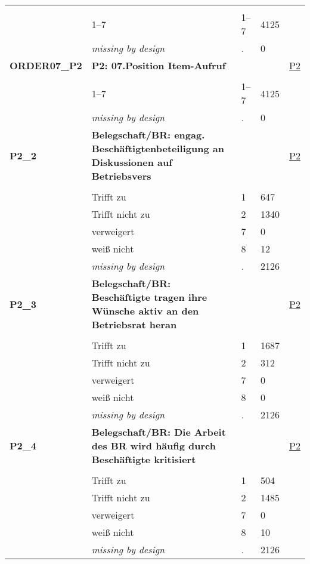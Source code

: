\begin{longtable}{| L{2.65cm} | L{8cm} | C{1.5cm} | R{1.25cm} | C{2.25cm}  |}
   &  &  &  &  \\ 
   & 1--7 & 1--7 & 4125 &  \\ 
   & \textit{missing by design} & \textit{.} & 0 &  \\ 
   \midrule
\textbf{ORDER07\_P2}\label{var:ORDER07:P2} & \textbf{P2: 07.Position Item-Aufruf} &  &  & \hyperref[P2]{P2} \\ 
   &  &  &  &  \\ 
   & 1--7 & 1--7 & 4125 &  \\ 
   & \textit{missing by design} & \textit{.} & 0 &  \\ 
   \midrule
\textbf{P2\_2}\label{var:P2:2} & \textbf{Belegschaft/BR: engag. Beschäftigtenbeteiligung an Diskussionen auf Betriebsvers} &  &  & \hyperref[P2]{P2} \\ 
   &  &  &  &  \\ 
   & Trifft zu & 1 & 647 &  \\ 
   & Trifft nicht zu & 2 & 1340 &  \\ 
   & verweigert & 7 & 0 &  \\ 
   & weiß nicht & 8 & 12 &  \\ 
   & \textit{missing by design} & \textit{.} & 2126 &  \\ 
   \midrule
\textbf{P2\_3}\label{var:P2:3} & \textbf{Belegschaft/BR: Beschäftigte tragen ihre Wünsche aktiv an den Betriebsrat heran} &  &  & \hyperref[P2]{P2} \\ 
   &  &  &  &  \\ 
   & Trifft zu & 1 & 1687 &  \\ 
   & Trifft nicht zu & 2 & 312 &  \\ 
   & verweigert & 7 & 0 &  \\ 
   & weiß nicht & 8 & 0 &  \\ 
   & \textit{missing by design} & \textit{.} & 2126 &  \\ 
   \midrule
\textbf{P2\_4}\label{var:P2:4} & \textbf{Belegschaft/BR: Die Arbeit des BR wird häufig durch Beschäftigte kritisiert} &  &  & \hyperref[P2]{P2} \\ 
   &  &  &  &  \\ 
   & Trifft zu & 1 & 504 &  \\ 
   & Trifft nicht zu & 2 & 1485 &  \\ 
   & verweigert & 7 & 0 &  \\ 
   & weiß nicht & 8 & 10 &  \\ 
   & \textit{missing by design} & \textit{.} & 2126 &  \\ 

\end{longtable}

